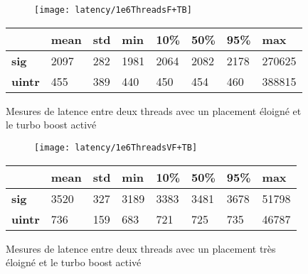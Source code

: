 \begin{figure}[H]
  \begin{subfigure}{\textwidth}
    \texttt{[image: latency/1e6ThreadsF+TB]}
    \caption{}
    \label{subfig:latency1e6ThreadsF-TB}
  \end{subfigure}
  \begin{subtable}{\textwidth}
    \centering
    \begin{tabular}{| l | l | l | l | l | l | l | l |}
      \hline
      &\bf mean &\bf std &\bf min  &\bf 10\% &\bf 50\% &\bf 95\% &\bf max\\
      \hline
      \bf sig   & 2097 & 282 & 1981 & 2064 & 2082 & 2178 & 270625\\
      \hline
      \bf uintr & 455  & 389 & 440  & 450 & 454 & 460 & 388815\\
      \hline
    \end{tabular}
    \caption{}
    \label{tab:latency1e6ThreadsF-TB}
  \end{subtable}
  \caption{Mesures de latence entre deux threads avec un placement éloigné et le turbo boost activé}
  \label{fig:latency1e6ThreadsF-TB}
\end{figure}

\begin{figure}[H]
  \begin{subfigure}{\textwidth}
    \texttt{[image: latency/1e6ThreadsVF+TB]}
    \caption{}
    \label{subfig:latency1e6ThreadsVF-TB}
  \end{subfigure}
  \begin{subtable}{\textwidth}
    \centering
    \begin{tabular}{| l | l | l | l | l | l | l | l |}
      \hline
      &\bf mean &\bf std &\bf min  &\bf 10\% &\bf 50\% &\bf 95\% &\bf max\\
      \hline
      \bf sig   & 3520 & 327 & 3189 & 3383 & 3481 & 3678 & 51798\\
      \hline
      \bf uintr & 736  & 159 & 683 & 721 & 725 & 735 & 46787\\
      \hline
    \end{tabular}
    \caption{}
    \label{tab:latency1e6ThreadsVF-TB}
  \end{subtable}
  \caption{Mesures de latence entre deux threads avec un placement très éloigné et le turbo boost activé}
  \label{fig:latency1e6ThreadsVF-TB}
\end{figure}
